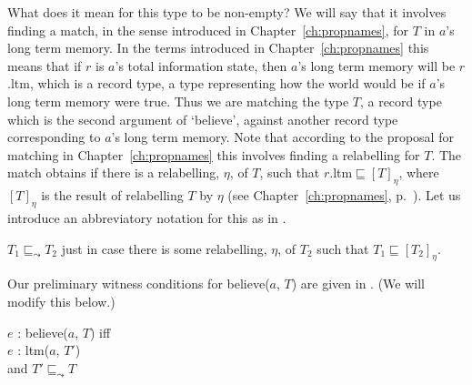 What does it mean for this type to be non-empty?  We will say that it
involves finding a match, in the sense introduced in
Chapter~\ref{ch:propnames}, for $T$ in $a$'s long term memory. In the
terms introduced in Chapter~\ref{ch:propnames} this means that if $r$
is $a$'s total information state, then $a$'s long term memory will be
$r$.ltm, which is a record type, a type representing how the world
would be if $a$'s long term memory were true.  Thus we are matching
the type $T$, a record type which is the second argument of `believe',
against another record type corresponding to $a$'s long term memory.
Note that according to the proposal for matching in
Chapter~\ref{ch:propnames} this involves finding a relabelling for $T$.  The match obtains if there is
a relabelling, $\eta$, of $T$, such that
$r$.ltm$\sqsubseteq[T]_{\eta}$, where $[T]_{\eta}$ is the result of
relabelling $T$ by $\eta$ (see Chapter~\ref{ch:propnames}, p.~\pageref{pg:relabelling-intro}). Let us introduce an
abbreviatory notation for this as in \nexteg{}.
\begin{ex} 
$T_1\sqsubseteq_{\leadsto}T_2$ just in case there is some relabelling,
$\eta$, of $T_2$ such that $T_1\sqsubseteq[T_2]_{\eta}$. 
\end{ex} 
  
Our preliminary witness conditions for believe($a$, $T$) are given in
\nexteg{}. (We will modify this below.)
\begin{ex} 
$e$ : believe($a$, $T$) iff\\
\hspace*{2em} $e$ : ltm($a$, $T'$) \\
\hspace*{2em} and $T'\sqsubseteq_{\leadsto}T$ 
\label{ex:believe-witcond-prelim}
\end{ex} 
   

